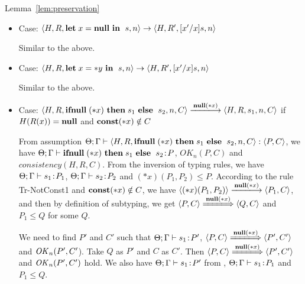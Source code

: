 \begin{pfof}{Lemma~\ref{lem:preservation}}
\begin{itemize}
  We need to find \(P'\) and \(C'\) such that \(\Theta; \Gamma,x',y
  \vdash [x'/x]s : P'\) , \( \langle P, C \rangle \rightarrow \langle
  P', C' \rangle\), \(\OK_n(P', C'\)) and \(consistency(H, R',
  C')\). Take \(Q\) as \(P'\) and \(C\) as \(C'\). Then \( \langle P,C
  \rangle \Longrightarrow \langle P', C' \rangle\) and \(\OK_n(P',
  C')\) hold. From \(\Theta; \Gamma, x,y \vdash s\COL P''\) and \(
  \LET x = y\; \IN P'' \le P\), we have \(\Theta; \Gamma, x'',y \vdash
       [x''/x]s : [x''/x]P''\) and \( \LET x'' = y\; \IN [x''/x]P''
       \le P\), and then by subtying we have \([x''/x]P'' \le Q'\) for
       some \(Q'\). Therefore, we have \(\Theta; \Gamma, x'',y \vdash
       [x''/x]s : Q'\). Take \(x''\) as \(x'\) and \(Q'\) as \(P'\),
       then \(\Theta; \Gamma,x',y \vdash [x'/x]s : P'\) holds.
  
\item Case: \( \langle H, R, \LET x = \NULL \ \IN \ s, n\rangle
  \rightarrow \langle H, R', [x'/x]s, n \rangle \)

  Similar to the above.

\item Case: \( \langle H, R, \mathbf{let}\; x = *y \ \mathbf{in}\; \ s, n\rangle
  \rightarrow \langle H, R', [x'/x]s, n\rangle \)

  Similar to the above.

\item Case: \(\langle H, R, \IFNULL \Sirx \ \THEN s_{1} \ \ELSE
  \ s_{2}, n, C\rangle \xlongrightarrow{\snull} \langle H, R, s_{1}, n, C \rangle\)
  if \(H(R(x)) = \mathbf{null}\) and \(\mathbf{const}(*x) \notin C\)

  From assumption \( \Theta; \Gamma \vdash \langle H, R, \mathbf{ifnull}\;(*x)
  \ \mathbf{then}\; s_{1} \ \mathbf{else}\; \ s_{2}, n, C \rangle : \langle P, C
  \rangle\), we have \(\Theta; \Gamma \vdash \mathbf{ifnull}\;(*x) \ \mathbf{then}\;
  s_{1} \ \mathbf{else}\; \ s_{2} \!:\! P \), \(OK_n(P, C)\) and \(consistency(H,
  R, C)\). From the inversion of typing rules, we have \(\Theta;
  \Gamma \vdash s_{1} \!:\! P_1\), \(\Theta; \Gamma \vdash s_{2} \!:\!
  P_2\) and \((*x)(P_1, P_2) \le P\). According to the rule
  Tr-NotConst1 and \(\mathbf{const}(*x) \notin C\), we have \(\langle
  (*x)(P_1, P_2) \rangle \xlongrightarrow{\snull} \langle P_1,
  C\rangle \), and then by definition of subtyping, we get \(\langle
  P, C \rangle \xLongrightarrow{\snull} \langle Q, C \rangle \) and
  \(P_1 \le Q\) for some \(Q\).

  We need to find \(P'\) and \(C'\) such that \(\Theta;\Gamma \vdash
  s_1\!:\! P'\), \( \langle P, C \rangle \xLongrightarrow{\snull}
  \langle P', C' \rangle\) and \(\OK_n(P', C'\)). Take \(Q\) as \(P'\)
  and \(C\) as \(C'\). Then \( \langle P,C \rangle
  \xLongrightarrow{\snull} \langle P', C' \rangle\) and \(\OK_n(P',
  C')\) hold.  We also have \(\Theta; \Gamma \vdash s_1 \!:\! P'\) from
  , \(\Theta; \Gamma \vdash s_1 \!:\! P_1\) and \( P_1 \le
  Q\).


\end{itemize}
\end{pfof}

